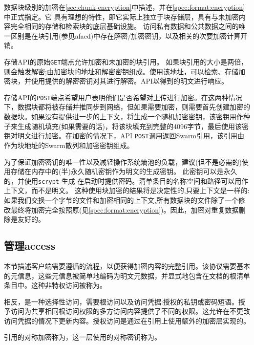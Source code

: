 数据块级别的加密在\ref{sec:chunk-encryption}中描述，并在\ref{spec:format:encryption}中正式指定。它
具有理想的特性，即它实际上独立于块存储层，具有与未加密内容完全相同的存储和检索块的底层基础设施。
访问私有数据和公共数据之间的唯一区别是在块引用(参见afaed)中存在解密/加密密钥，以及相关的次要加密计算开销。


存储API的原始\lstinline{GET}端点允许加密和未加密的块引用。
如果块引用的大小是两倍，则会触发解密;由加密块的地址和解密密钥组成。使用该地址，可以检索、存储加密块，并使用提供的解密密钥对其进行解密。API以得到的明文进行响应。

存储API的\lstinline{POST}端点希望用户表明他们是否希望对上传进行加密。在这两种情况下，数据块都将被存储并推同步到网络，但如果需要加密，则需要首先创建加密的数据块。如果没有提供进一步的上下文，将生成一个随机加密密钥，该密钥用作种子来生成随机填充(如果需要的话)，将该块填充到完整的4096字节，最后使用该密钥对明文进行加密。在加密的情况下，API \lstinline{POST}调用返回Swarm引用，该引用由作为块地址的Swarm散列和加密密钥组成。

为了保证加密密钥的唯一性以及减轻操作系统熵池的负载，建议(但不是必需的)使用存储在内存中的(半)永久随机密钥作为明文的生成密钥。
此密钥可以是永久的，并使用\lstinline{scrypt} \cite{percival2009stronger}生成
在启动时提供密码。清单条目的名称空间和路径可以用作上下文，而不是明文。
这种使用块加密的结果将是决定性的,只要上下文是一样的:如果我们交换一个字节的文件和加密相同的上下文,所有数据块的文件除了一个修改最终将加密完全按照原(见\ref{spec:format:encryption})。因此，加密对重复数据删除是友好的。 


\subsection{管理access\statusgreen}\label{sec:managing-access}

本节描述客户端需要遵循的流程，以便获得加密内容的完整引用。该协议需要基本的元信息，这些元信息被简单地编码为明文元数据，并显式地包含在文档的根清单条目中。这种非特权访问被称为。

相反，是一种选择性访问，需要根访问以及访问凭据:授权的私钥或密码短语。授予访问为共享相同根访问权限的多方访问内容提供了不同的权限。这允许在不更改访问凭据的情况下更新内容。授权访问是通过在引用上使用额外的加密层实现的。

引用的对称加密称为，这一层使用的对称密钥称为。

